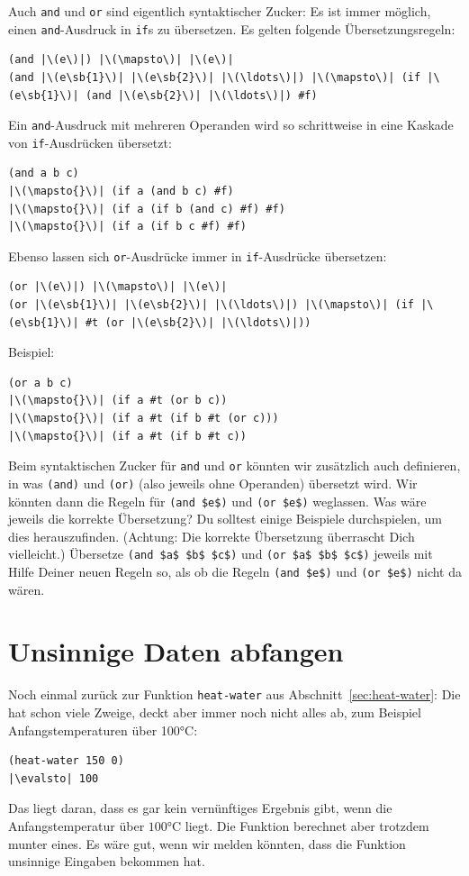 Auch \lstinline{and} und \lstinline{or} sind eigentlich syntaktischer Zucker:
Es ist immer möglich, einen \lstinline{and}-Ausdruck in \lstinline{if}s
zu übersetzen.  Es gelten folgende Übersetzungsregeln:
%
\begin{lstlisting}
(and |\(e\)|) |\(\mapsto\)| |\(e\)|
(and |\(e\sb{1}\)| |\(e\sb{2}\)| |\(\ldots\)|) |\(\mapsto\)| (if |\(e\sb{1}\)| (and |\(e\sb{2}\)| |\(\ldots\)|) #f)
\end{lstlisting}
%
Ein \lstinline{and}-Ausdruck mit mehreren Operanden wird so schrittweise
in eine Kaskade von \lstinline{if}-Ausdrücken übersetzt:
%
\begin{lstlisting}
(and a b c)
|\(\mapsto{}\)| (if a (and b c) #f)
|\(\mapsto{}\)| (if a (if b (and c) #f) #f)
|\(\mapsto{}\)| (if a (if b c #f) #f)
\end{lstlisting}
%
Ebenso lassen sich \lstinline{or}-Ausdrücke immer in
\lstinline{if}-Ausdrücke übersetzen:
%
\begin{lstlisting}
(or |\(e\)|) |\(\mapsto\)| |\(e\)|
(or |\(e\sb{1}\)| |\(e\sb{2}\)| |\(\ldots\)|) |\(\mapsto\)| (if |\(e\sb{1}\)| #t (or |\(e\sb{2}\)| |\(\ldots\)|))
\end{lstlisting}
%
Beispiel:
%
\begin{lstlisting}
(or a b c)
|\(\mapsto{}\)| (if a #t (or b c))
|\(\mapsto{}\)| (if a #t (if b #t (or c)))
|\(\mapsto{}\)| (if a #t (if b #t c))
\end{lstlisting}
%
\begin{aufgabeinline}
  Beim syntaktischen Zucker für \lstinline{and} und \lstinline{or} könnten
  wir zusätzlich auch definieren, in was \lstinline{(and)} und \lstinline{(or)} (also
  jeweils ohne Operanden) übersetzt wird.  Wir könnten dann die Regeln
  für \lstinline{(and $e$)} und \lstinline{(or $e$)} weglassen. Was wäre jeweils die
  korrekte Übersetzung?  Du solltest einige Beispiele durchspielen, um
  dies herauszufinden.  (Achtung: Die korrekte Übersetzung überrascht
  Dich vielleicht.)  Übersetze \lstinline{(and $a$ $b$ $c$)} und
  \lstinline{(or $a$ $b$ $c$)} jeweils mit Hilfe Deiner neuen Regeln so, als ob die Regeln
  \lstinline{(and $e$)} und \lstinline{(or $e$)} nicht da wären.
\end{aufgabeinline}

\section{Unsinnige Daten abfangen}
\label{sec:nonsensical-data}

Noch einmal zurück zur Funktion \lstinline{heat-water} aus
Abschnitt~\ref{sec:heat-water}: Die hat schon viele Zweige,
deckt aber immer noch nicht alles ab, zum Beispiel
Anfangstemperaturen über 100\si{\degree}C:
%
\begin{lstlisting}
(heat-water 150 0)
|\evalsto| 100
\end{lstlisting}
%
Das liegt daran, dass es gar kein vernünftiges Ergebnis gibt, wenn die
Anfangstemperatur über $100$\si{\degree}C liegt.  Die Funktion berechnet aber
trotzdem munter eines.  Es wäre gut, wenn wir melden
könnten, dass die Funktion unsinnige Eingaben bekommen hat.

